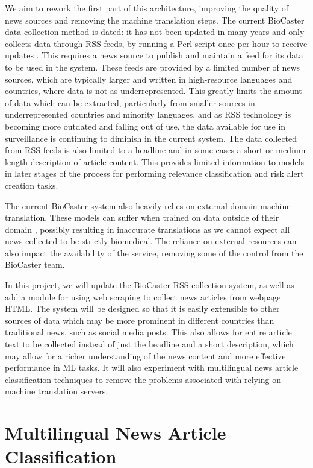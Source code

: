 \documentclass{l4proj}
\begin{document}
We aim to rework the first part of this architecture, improving the quality of news sources and removing the machine translation steps. The current BioCaster data collection method is dated: it has not been updated in many years and only collects data through RSS feeds, by running a Perl script once per hour to receive updates \citep{collier2008biocaster}. This requires a news source to publish and maintain a feed for its data to be used in the system. These feeds are provided by a limited number of news sources, which are typically larger and written in high-resource languages and countries, where data is not as underrepresented. This greatly limits the amount of data which can be extracted, particularly from smaller sources in underrepresented countries and minority languages, and as RSS technology is becoming more outdated and falling out of use, the data available for use in surveillance is continuing to diminish in the current system. The data collected from RSS feeds is also limited to a headline and in some cases a short or medium-length description of article content. This provides limited information to models in later stages of the process for performing relevance classification and risk alert creation tasks. \par
The current BioCaster system also heavily relies on external domain machine translation. These models can suffer when trained on data outside of their domain \citep{koehn2017six}, possibly resulting in inaccurate translations as we cannot expect all news collected to be strictly biomedical. The reliance on external resources can also impact the availability of the service, removing some of the control from the BioCaster team. \par
In this project, we will update the BioCaster RSS collection system, as well as add a module for using web scraping to collect news articles from webpage HTML. The system will be designed so that it is easily extensible to other sources of data which may be more prominent in different countries than traditional news, such as social media posts. This also allows for entire article text to be collected instead of just the headline and a short description, which may allow for a richer understanding of the news content and more effective performance in ML tasks. It will also experiment with multilingual news article classification techniques to remove the problems associated with relying on machine translation servers.

\section{Multilingual News Article Classification}
\end{document}
